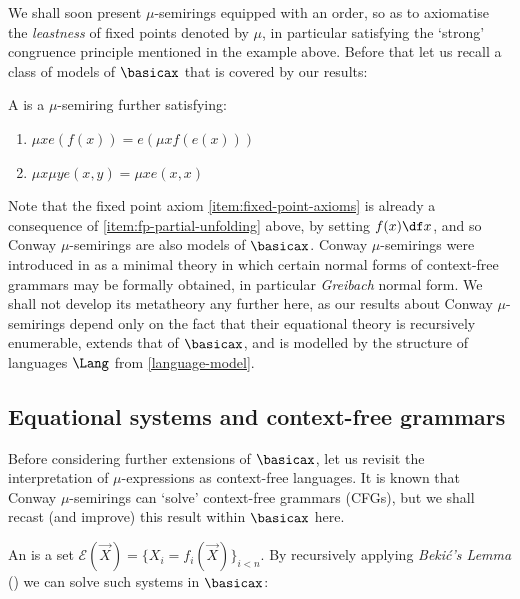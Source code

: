 We shall soon present $\mu$-semirings equipped with an order, so as to axiomatise the \emph{leastness} of fixed points denoted by $\mu$, in particular satisfying the `strong' congruence principle mentioned in the example above.
Before that let us recall a class of models of $\basicax$ that is covered by our results:

\begin{definition}
    A  is a $\mu$-semiring further satisfying:
    \begin{enumerate}
    \item\label{item:fp-partial-unfolding} $\mu x e(f(x)) = e(\mu x f(e(x)))$
        \item\label{item:fp-diagonal} $\mu x \mu y e(x,y) = \mu x e(x,x)$
    \end{enumerate}
\end{definition}

Note that the fixed point axiom \eqref{item:fixed-point-axioms} is already a consequence of \eqref{item:fp-partial-unfolding} above, by setting $f(x)\df x$, and so Conway $\mu$-semirings are also models of $\basicax$.
Conway $\mu$-semirings were introduced in \cite{EsikLeiss05} as a minimal theory in which certain normal forms of context-free grammars may be formally obtained, in particular \emph{Greibach} normal form. 
We shall not develop its metatheory any further here, as our results about Conway $\mu$-semirings depend only on the fact that their equational theory is recursively enumerable, extends that of $\basicax$, and is modelled by the structure of languages $\Lang$ from \cref{language-model}.

\subsection{Equational systems and context-free grammars}
Before considering further extensions of $\basicax$, let us revisit the interpretation of $\mu$-expressions as context-free languages.
It is known that Conway $\mu$-semirings can `solve' context-free grammars (CFGs), but we shall recast (and improve) this result within $\basicax$ here.


An  is a set $\mathcal E (\vec X) = \{X_i = f_i(\vec X)\}_{i<n}$.
 By recursively applying \emph{Beki\'c's Lemma} (\cite{Bekic84}) we can solve such systems in $\basicax$:

